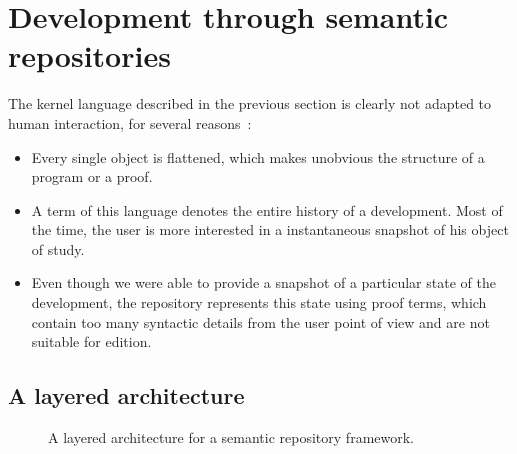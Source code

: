 \section{Development through semantic repositories}
\label{devel}


The kernel language described in the previous section is clearly not
adapted to human interaction, for several reasons~: 
\begin{itemize}

\item Every single object is flattened, which makes unobvious the
  structure of a program or a proof. 

\item A term of this language denotes the entire history of a
  development. Most of the time, the user is more interested in a
  instantaneous snapshot of his object of study.

\item Even though we were able to provide a snapshot of a particular
  state of the development, the repository represents this state 
  using proof terms, which contain too many syntactic details from the
  user point of view and are not suitable for edition.  

\end{itemize}


\subsection{A layered architecture}


\begin{figure}
\begin{center}
\end{center}
\label{fig:architecture}
\caption{A layered architecture for a semantic repository framework.}
\end{figure}

